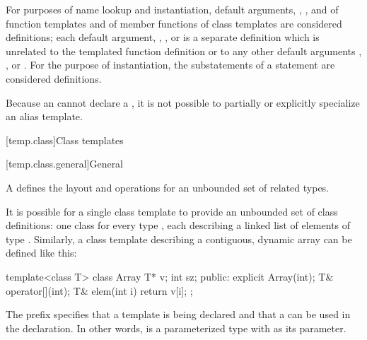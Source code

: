 \pnum
For purposes of name lookup and instantiation,
default arguments,
,
,
and
of function templates
and
of member functions of class templates
are considered definitions;
each
default argument,
,
,
or
is a separate definition
which is unrelated
to the templated function definition or
to any other
default arguments
,
,
or
.
For the purpose of instantiation, the substatements of a
 statement are considered definitions.

\pnum
Because an  cannot declare a
, it is not possible to partially or
explicitly specialize an alias template.

[temp.class]{Class templates}

[temp.class.general]{General}

\pnum
A
defines the layout and operations
for an unbounded set of related types.

\pnum
\begin{example}
It is possible for a single class template
to provide an unbounded set of class definitions:
one class  for every type ,
each describing a linked list of elements of type .
Similarly, a class template  describing a contiguous,
dynamic array can be defined like this:
\begin{codeblock}
template<class T> class Array {
  T* v;
  int sz;
public:
  explicit Array(int);
  T& operator[](int);
  T& elem(int i) { return v[i]; }
};
\end{codeblock}
The prefix 
specifies that a template is being declared and that a
 
can be used in the declaration.
In other words,
is a parameterized type with
as its parameter.
\end{example}

